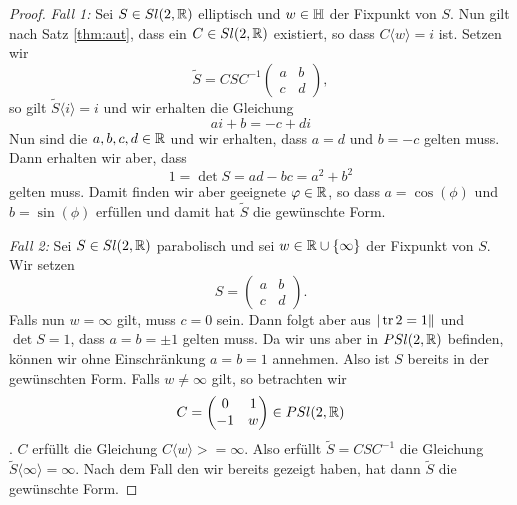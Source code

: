 \begin{proof}
  \emph{Fall 1:} Sei $S \in Sl(2, \mathbb{R})$ elliptisch und $w \in \mathbb{H}$ der
  Fixpunkt von $S$. Nun gilt nach Satz \ref{thm:aut}, dass ein $C \in
  Sl(2,\mathbb{R})$ existiert, so dass $C \langle w \rangle = i$ ist. Setzen
  wir
  \[
  \tilde S = CSC^{-1}
  \begin{pmatrix}
    a & b\\
    c & d
  \end{pmatrix},
  \]
  so gilt $\tilde S\langle i \rangle = i$ und wir erhalten die
  Gleichung
  \[
  ai +b = -c + di
  \]
  Nun sind die $a,b,c,d \in \mathbb{R}$ und wir erhalten, dass $a = d$ und $b
  = - c$ gelten muss. Dann erhalten wir aber, dass
  \[
  1 = \det S = ad - bc = a^2 + b^2
  \]
  gelten muss. Damit finden wir aber geeignete $\varphi \in \mathbb{R}$, so dass
  $a = \cos(\phi)$ und $b = \sin(\phi)$ erfüllen und damit hat $\tilde
  S$ die gewünschte Form.

  \emph{Fall 2:} Sei $S \in Sl(2, \mathbb{R})$ parabolisch und sei $w \in \mathbb{R}
  \cup \{\infty\}$ der Fixpunkt von $S$. Wir setzen
  \[
  S =
  \begin{pmatrix}
    a & b\\
    c & d
  \end{pmatrix}.
  \]
  Falls nun $w = \infty$ gilt, muss $c =0$ sein. Dann folgt aber aus
  $|\operatorname{tr} 2 = 1\|$ und $\det S = 1$, dass $a = b = \pm 1$ gelten
  muss. Da wir uns aber in $PSl(2,\mathbb{R})$ befinden, können wir ohne
  Einschränkung $a = b = 1$ annehmen. Also ist $S$ bereits in der
  gewünschten Form. Falls $w \neq \infty$ gilt, so betrachten wir
  \[
  C =
  \begin{pmatrix}
    0 & 1 \\
    -1 & w
  \end{pmatrix}
  \in PSl(2,\mathbb{R})
  \].
  $C$ erfüllt die Gleichung $C \langle w \rangle > = \infty$. Also
  erfüllt $\tilde S = C S C^{-1}$ die Gleichung $\tilde S\langle \infty
  \rangle = \infty$. Nach dem Fall den wir bereits gezeigt haben, hat
  dann $\tilde S$ die gewünschte Form.


\end{proof}

